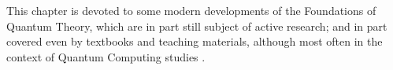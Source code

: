 This chapter is devoted to some modern developments
of the Foundations of Quantum Theory, which are in part
still subject of active research; and in part covered
even by textbooks and teaching materials, although
most often in the context of Quantum Computing studies
\parencite{PreskillNotes, Haroche_Exploring, Nakahara, NielsenChuang}.